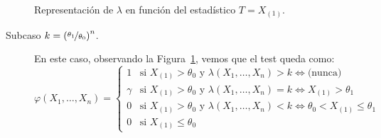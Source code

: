 \begin{ejercicio}
\begin{description}
\begin{figure}[h]
            \caption{Representación de $\lambda$ en función del estadístico $T = X_{(1)}$.}
            \label{fig:razon_verosimilitudes_ej7.6.1}
        \end{figure}

        \begin{description}
            \item[Subcaso $k = \left(\nicefrac{\theta_1}{\theta_0}\right)^n$.] En este caso, observando la Figura~\ref{fig:razon_verosimilitudes_ej7.6.1}, vemos que el test queda como:
            \begin{equation*}
                \varphi(X_1, \ldots, X_n) = \left\{\begin{array}{ll}
                    1 & \text{si\ } X_{(1)} > \theta_0 \text{\ y\ } \lambda(X_1, \ldots, X_n) > k \iff \text{(nunca)} \\
                    \gamma & \text{si\ } X_{(1)} > \theta_0 \text{\ y\ } \lambda(X_1, \ldots, X_n) = k \iff X_{(1)} > \theta_1 \\
                    0 & \text{si\ } X_{(1)} > \theta_0 \text{\ y\ } \lambda(X_1, \ldots, X_n) < k \iff \theta_0 < X_{(1)} \leq \theta_1 \\
                    0 & \text{si\ } X_{(1)} \leq \theta_0
                \end{array}\right.
            \end{equation*}


\end{description}
\end{description}
\end{ejercicio}
